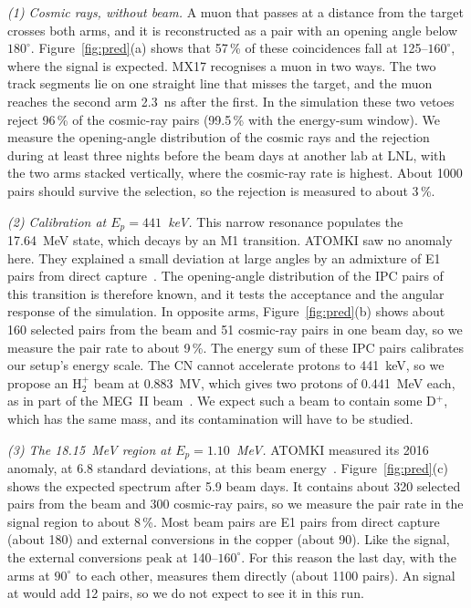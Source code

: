 \emph{(1) Cosmic rays, without beam.} A muon that passes at a distance from the target crosses both arms, and it is
reconstructed as a pair with an opening angle below $180^\circ$. Figure~\ref{fig:pred}(a) shows that 57\,\% of these
coincidences fall at 125--$160^\circ$, where the \Xs{} signal is expected. MX17 recognises a muon in two ways. The two track segments lie on one straight line that misses
the target, and the muon reaches the second arm 2.3~ns after the first. In the simulation these two vetoes reject 96\,\% of the cosmic-ray pairs (99.5\,\% with the
energy-sum window). We measure the opening-angle distribution of the cosmic rays and the rejection during at least
three nights before the beam days at another lab at LNL, with the two arms stacked vertically, where the cosmic-ray rate is highest. About 1000
pairs should survive the selection, so the rejection is measured to about 3\,\%.

\emph{(2) Calibration at $E_p = 441$~keV.} This narrow resonance populates the 17.64~MeV state, which decays by an M1
transition. ATOMKI saw no anomaly here. They explained a small deviation at large angles by an admixture of E1 pairs from direct capture~\cite{Kra16}. The opening-angle distribution of the IPC pairs of this transition is therefore known,
and it tests the acceptance and the angular response of the simulation. In opposite arms, Figure~\ref{fig:pred}(b) shows about 160 selected pairs from the beam and 51 cosmic-ray pairs in
one beam day, so we measure the pair rate to about 9\,\%. The energy sum of these IPC pairs calibrates our setup's energy scale. The CN cannot accelerate
protons to 441~keV, so we propose an H$_2^+$ beam at 0.883~MV, which gives two protons of 0.441~MeV each, as in part of
the MEG~II beam~\cite{MEG24}. We expect such a beam to contain some D$^+$, which has the same mass, and its
contamination will have to be studied. 

\emph{(3) The 18.15~MeV region at $E_p = 1.10$~MeV.} ATOMKI measured its 2016 anomaly, at 6.8 standard deviations, at this beam energy~\cite{Kra16}.
Figure~\ref{fig:pred}(c) shows the expected spectrum after 5.9 beam days. It contains about 320 selected pairs from the
beam and 300 cosmic-ray pairs, so we measure the pair rate in the signal region to about 8\,\%. Most beam pairs are E1
pairs from direct capture (about 180) and external conversions in the copper (about 90). Like the signal, the
external conversions peak at 140--$160^\circ$. For this reason the last day, with the arms at $90^\circ$ to each other,
measures them directly (about 1100 pairs). An \Xs{} signal at \Ratk{} would add 12 pairs, so we do not expect to see it in this run.

